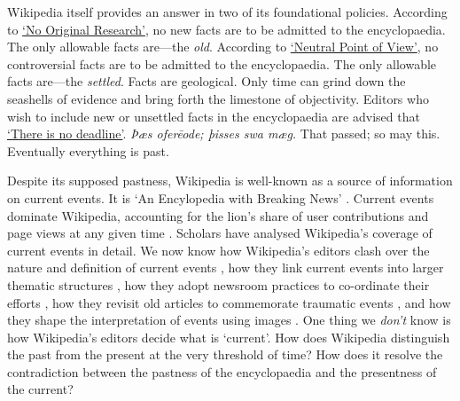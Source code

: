 \documentclass[Royal,times,sageh]{sagej}
\begin{document}
Wikipedia itself provides an answer in two of its foundational policies.
According to
\href{https://en.wikipedia.org/wiki/Wikipedia:No_original_research}{`No
Original Research'}, no new facts are to be admitted to the
encyclopaedia. The only allowable facts are---the \emph{old}. According
to
\href{https://en.wikipedia.org/wiki/Wikipedia:Neutral_point_of_view}{`Neutral
Point of View'}, no controversial facts are to be admitted to the
encyclopaedia. The only allowable facts are---the \emph{settled}. Facts
are geological. Only time can grind down the seashells of evidence and
bring forth the limestone of objectivity. Editors who wish to include
new or unsettled facts in the encyclopaedia are advised that
\href{https://en.wikipedia.org/wiki/Wikipedia:There_is_no_deadline}{`There
is no deadline'}. \emph{Þæs oferēode; þisses swa mæg.} That passed; so
may this. Eventually everything is past.

Despite its supposed pastness, Wikipedia is well-known as a source of
information on current events. It is `An Encylopedia with Breaking News'
\citep{keegan_encyclopedia_2019}. Current events dominate Wikipedia,
accounting for the lion's share of user contributions and page views at
any given time \citep{keegan_hot_2011}. Scholars have analysed
Wikipedia's coverage of current events in detail. We now know how
Wikipedia's editors clash over the nature and definition of current
events \citep{ford_writing_2022, pentzold_fixing_2009}, how they link
current events into larger thematic structures
\citep{twyman_black_2017}, how they adopt newsroom practices to
co-ordinate their efforts \citep{avieson_breaking_2019}, how they
revisit old articles to commemorate traumatic events
\citep{ferron_beyond_2014}, and how they shape the interpretation of
events using images \citep{porter_visual_2020}. One thing we
\emph{don't} know is how Wikipedia's editors decide what is `current'.
How does Wikipedia distinguish the past from the present at the very
threshold of time? How does it resolve the contradiction between the
pastness of the encyclopaedia and the presentness of the current?
\end{document}

